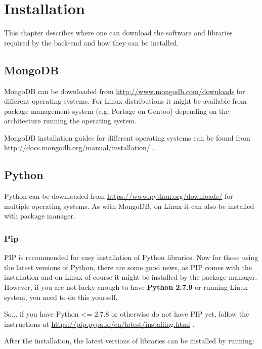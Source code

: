 \documentclass[letterpaper,10pt,english]{sphinxmanual}
\begin{document}
\chapter{Installation}
\label{installation:installation}\label{installation::doc}
This chapter describes where one can download the software and libraries required by the back-end and how they can be
installed.


\section{MongoDB}
\label{installation:mongodb}
MongoDB can be downloaded from \href{http://www.mongodb.com/downloads}{http://www.mongodb.com/downloads} for different operating systems. For Linux distributions
it might be available from package management system (e.g. Portage on Gentoo) depending on the architecture running the operating
system.

MongoDB installation guides for different operating systems can be found from \href{http://docs.mongodb.org/manual/installation/}{http://docs.mongodb.org/manual/installation/} .


\section{Python}
\label{installation:python}
Python can be downloaded from \href{https://www.python.org/downloads/}{https://www.python.org/downloads/} for multiple operating systems. As with MongoDB, on Linux
it can also be installed with package manager.


\subsection{Pip}
\label{installation:pip}
PIP is recommended for easy installation of Python libraries. Now for those using the latest versions of Python, there
are some good news, as PIP comes with the installation and on Linux of course it might be installed by the package manager.
However, if you are not lucky enough to have \textbf{Python 2.7.9} or running Linux system, you need to do this yourself.

So... if you have Python \textless{}= 2.7.8 or otherwise do not have PIP yet, follow the instructions at \href{https://pip.pypa.io/en/latest/installing.html}{https://pip.pypa.io/en/latest/installing.html} .

After the installation, the latest versions of libraries can be installed by running:
\end{document}
